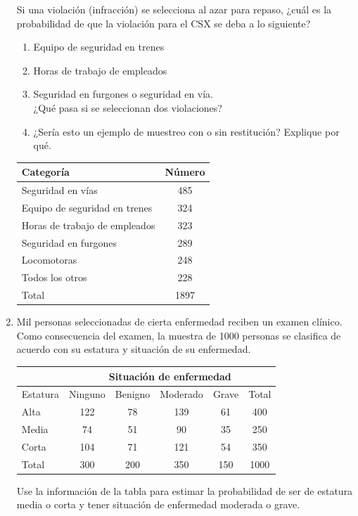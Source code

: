 \documentclass[10pt,twoside]{article}
\begin{document}
\begin{enumerate}
Si una violación (infracción) se selecciona al azar para repaso, ¿cuál es la probabilidad de que la violación para el CSX se deba a lo siguiente?

\begin{minipage}{.4\textwidth}
\begin{enumerate}
\item Equipo de seguridad en trenes
\item Horas de trabajo de empleados
\item Seguridad en furgones o seguridad en vía.\\
 ¿Qué pasa si se seleccionan dos violaciones?
 \item ¿Sería esto un ejemplo de muestreo con o sin restitución? Explique por qué.
\end{enumerate}
\end{minipage}\hfill
\begin{minipage}{.55\textwidth}
\begin{center}
\begin{tabular}{lc}
Categor\'{i}a & N\'{u}mero \\ 
\hline 
Seguridad en v\'{i}as & 485 \\ 
Equipo de seguridad en trenes & 324 \\ 
Horas de trabajo de empleados & 323 \\ 
Seguridad en furgones & 289 \\ 
Locomotoras & 248 \\ 
Todos los otros & 228 \\ 
\hline 
Total & 1897 \\ 
\end{tabular} 
\end{center}
\end{minipage}
\item Mil personas seleccionadas de cierta enfermedad reciben un examen clínico. Como consecuencia del examen, la muestra de 1000 personas se clasifica de acuerdo con su estatura y situaci\'{o}n de su enfermedad.
\begin{center}
\begin{tabular}{lccccc}
 & \multicolumn{5}{c}{Situación de enfermedad} \\ \hline 
Estatura & Ninguno & Benigno & Moderado & Grave & Total \\ \hline
Alta & 122 & 78 & 139 & 61 & 400 \\ 
Media & 74 & 51 & 90 & 35 & 250 \\ 
Corta & 104 & 71 & 121 & 54 & 350 \\ 
\hline 
Total & 300 & 200 & 350 & 150 & 1000 \\ 
\hline 
\end{tabular} 

\end{center}Use la información de la tabla para estimar la probabilidad de ser de estatura media o corta y tener situación de enfermedad moderada o grave.
\end{enumerate}
\end{document}
